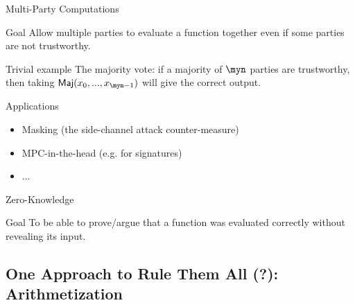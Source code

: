 \documentclass[presentation,aspectratio=1610]{beamer}
\begin{document}
\begin{frame}{Multi-Party Computations}
  \begin{exampleblock}{Goal}
    Allow multiple parties to evaluate a function together even if some parties are not trustworthy.
  \end{exampleblock}

  \pause
  
  \begin{alertblock}{Trivial example}
    The majority vote: if a majority of $\myn$ parties are trustworthy, then taking $\mathsf{Maj}(x_0,...,x_{\myn-1})$ will give the correct output.
  \end{alertblock}

  \pause

  \begin{block}{Applications}
    \begin{itemize}
    \item Masking (the side-channel attack counter-measure)
    \item MPC-in-the-head (e.g. for signatures)
    \item ...
    \end{itemize}
  \end{block}
\end{frame}




\begin{frame}{Zero-Knowledge}
  \begin{exampleblock}{Goal}
    To be able to prove/argue that a function was evaluated correctly
    without revealing its input.
  \end{exampleblock}
\end{frame}


\subsection{One Approach to Rule Them All (?): Arithmetization}
\end{document}
